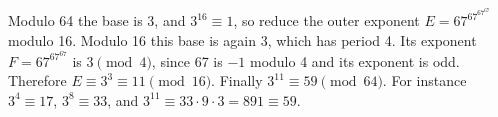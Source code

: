 Modulo 64 the base is 3, and $3^{16}\equiv1$, so reduce the outer exponent $E=67^{67^{67^{67}}}$ modulo 16. Modulo 16 this base is again 3, which has period 4. Its exponent $F=67^{67^{67}}$ is $3\pmod4$, since 67 is $-1$ modulo 4 and its exponent is odd. Therefore $E\equiv3^3\equiv11\pmod{16}$. Finally $3^{11}\equiv\boxed{59}\pmod{64}$. For instance $3^4\equiv17$, $3^8\equiv33$, and $3^{11}\equiv33\cdot9\cdot3=891\equiv59$.
